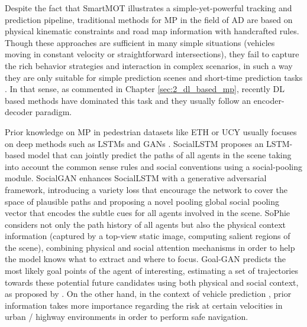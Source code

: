 Despite the fact that SmartMOT illustrates a simple-yet-powerful tracking and prediction pipeline, traditional methods for \ac{MP} in the field of \ac{AD} are based on physical kinematic constraints and road map information with handcrafted rules. Though these approaches are sufficient in many simple situations (\ie vehicles moving in constant velocity or straightforward intersections), they fail to capture the rich behavior strategies and interaction in complex scenarios, in such a way they are only suitable for simple prediction scenes and short-time prediction tasks \cite{huang2022survey}. In that sense, as commented in Chapter \ref{sec:2_dl_based_mp}, recently \ac{DL} based methods have dominated this task and they usually follow an encoder-decoder paradigm. 

Prior knowledge on \ac{MP} in pedestrian datasets like ETH \cite{pellegrini2009you} or UCY \cite{lerner2007ucydata} usually focuses on deep methods such as \acp{LSTM} \cite{hochreiter1997long} and \acp{GAN} \cite{goodfellow2020generative}. SocialLSTM \cite{alahi2016social} proposes an \ac{LSTM}-based model that can jointly predict the paths of all agents in the scene taking into account the common sense rules and social conventions using a social-pooling module. SocialGAN \cite{gupta2018social} enhances SocialLSTM with a generative adversarial framework, introducing a variety loss that encourage the network to cover the space of plausible paths and proposing a novel pooling global social pooling vector that encodes the subtle cues for all agents involved in the scene. SoPhie \cite{sadeghian2019sophie} considers not only the path history of all agents but also the physical context information (captured by a top-view static image, computing salient regions of the scene), combining physical and social attention mechanisms in order to help the model knows what to extract and where to focus. Goal-GAN \cite{dendorfer2020goal} predicts the most likely goal points of the agent of interesting, estimating a set of trajectories towards these potential future candidates using both physical and social context, as proposed by \cite{sadeghian2019sophie}. On the other hand, in the context of vehicle prediction \cite{chang2019argoverse, caesar2020nuscenes}, prior information takes more importance regarding the risk at certain velocities in urban / highway environments in order to perform safe navigation.

